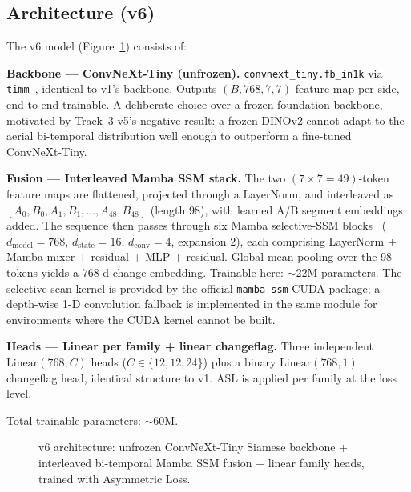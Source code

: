 \documentclass[journal]{IEEEtran}
\begin{document}
\subsection{Architecture (v6)}\label{ssec:arch}

The v6 model (Figure~\ref{fig:architecture}) consists of:

\textbf{Backbone --- ConvNeXt-Tiny (unfrozen).} \texttt{convnext\_tiny.fb\_in1k} via \texttt{timm}~\cite{wightman2019timm}, identical to v1's backbone. Outputs $(B, 768, 7, 7)$ feature map per side, end-to-end trainable. A deliberate choice over a frozen foundation backbone, motivated by Track~3 v5's negative result: a frozen DINOv2 cannot adapt to the aerial bi-temporal distribution well enough to outperform a fine-tuned ConvNeXt-Tiny.

\textbf{Fusion --- Interleaved Mamba SSM stack.} The two $(7{\times}7=49)$-token feature maps are flattened, projected through a LayerNorm, and interleaved as $[A_0, B_0, A_1, B_1, \ldots, A_{48}, B_{48}]$ (length 98), with learned A/B segment embeddings added. The sequence then passes through six Mamba selective-SSM blocks~\cite{gu2023mamba} ($d_\mathrm{model}{=}768$, $d_\mathrm{state}{=}16$, $d_\mathrm{conv}{=}4$, expansion $2$), each comprising LayerNorm + Mamba mixer + residual + MLP + residual. Global mean pooling over the 98 tokens yields a $768$-d change embedding. Trainable here: $\sim$22M parameters. The selective-scan kernel is provided by the official \texttt{mamba-ssm} CUDA package; a depth-wise 1-D convolution fallback is implemented in the same module for environments where the CUDA kernel cannot be built.

\textbf{Heads --- Linear per family + linear changeflag.} Three independent $\mathrm{Linear}(768, C)$ heads ($C \in \{12, 12, 24\}$) plus a binary $\mathrm{Linear}(768, 1)$ changeflag head, identical structure to v1. ASL is applied per family at the loss level.

Total trainable parameters: $\sim$60M.

\begin{figure}[!t]
  \centering
  \caption{v6 architecture: unfrozen ConvNeXt-Tiny Siamese backbone + interleaved bi-temporal Mamba SSM fusion + linear family heads, trained with Asymmetric Loss.}
  \label{fig:architecture}
\end{figure}
\end{document}
